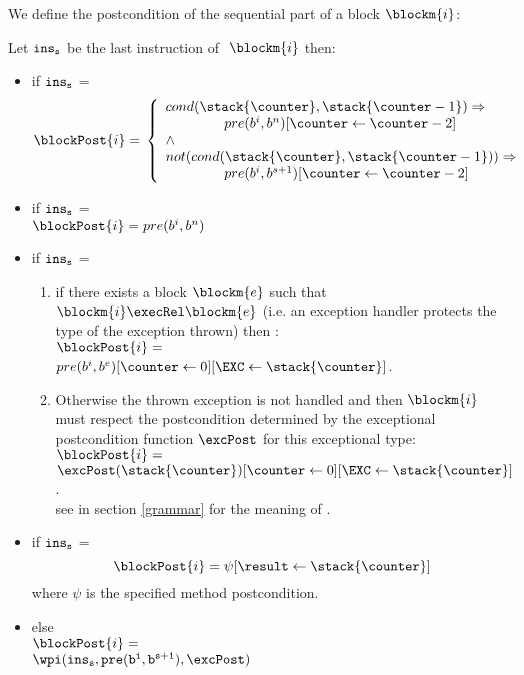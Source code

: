 We define the postcondition of the sequential part of a block $\blockm{i}$: 
\begin{defn}\label{post}
 Let $\tt{ins}_s$ be the last instruction of $\ \blockm{i} $ then:
 \begin{itemize} 
 
 \item if  $\tt{ins}_s$ =   \\
$$
\blockPost{i} =  \\
\left\{
\begin{array}{l}
cond( \stack{\counter}, \stack{\counter - 1} )   \Rightarrow \\
\phantom{ \counter }   pre(b^{i}, b^{n})[ \counter \leftarrow \counter -2 ]  \\
\wedge \\
 not ( cond( \stack{\counter}, \stack{\counter - 1} )  )   \Rightarrow \\
\phantom{ \counter}    pre(b^{i}, b^{s+1})[ \counter \leftarrow \counter -2 ]      \\                             
\end{array}
\right.
$$
\item if  $\tt{ins}_s$ =   \\ 
$\blockPost{i} =  pre(b^{i}, b^{n})$ \\

\item  if  $\tt{ins}_s$ =   \\ 
	\begin{enumerate}
\item if there exists a block $\blockm{e}$ such that 
$\blockm{i} \execRel \blockm{e}$ (i.e. an exception handler protects the type of the exception thrown)
then :\\
$\blockPost{i }=$\\
$ pre(b^{i}, b^{e})[\counter \leftarrow 0][\EXC \leftarrow \stack{\counter}] $. \\
\item Otherwise the thrown exception is not handled and then $\blockm{i}$ must respect the postcondition determined by
the exceptional postcondition function $\excPost$ for this exceptional type:\\ %
 $\blockPost{i }=$\\ $\excPost(\stack{\counter}) [\counter \leftarrow 0][\EXC \leftarrow \stack{\counter}] $. \\
see in section \ref{grammar} for the meaning of \EXC.
    \end{enumerate}
\item  if  $\tt{ins}_s$ =  \\
$$
   \blockPost{i } = \psi[\result \leftarrow \stack{\counter} ]    
$$
where $\psi $ is the specified method postcondition.
\item  else  \\[3 mm]
 $ \blockPost{i} =$  \\ $\wpi(  \tt{ins}_s , pre(b^{i}, b^{s+1}) , \excPost)  $
 \end{itemize}


\end{defn}
